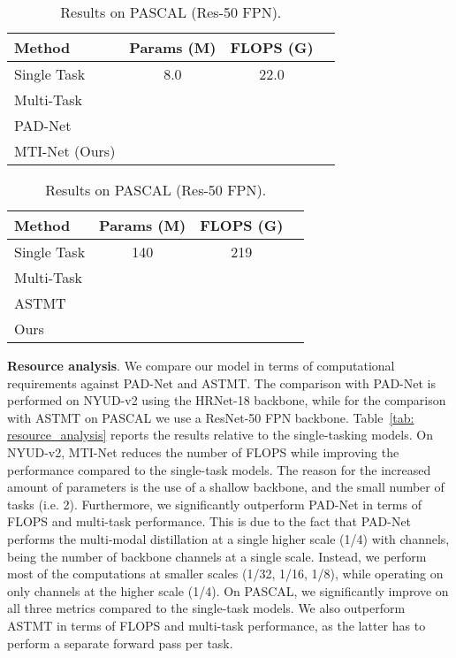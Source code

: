 \documentclass[runningheads]{llncs}
\begin{document}
\begin{table}[t]
    \caption{Computational resource analysis (number of parameters and FLOPS).}
    \label{tab: resource_analysis}
    \begin{subtable}[t]{0.47\linewidth}
    \caption{Results on NYUD-v2 (HRNet-18).}
    \label{tab: nyu_resources}
    \centering
    \tiny{
    \begin{tabular}{|l|c|c|c|}
    \hline
    Method & Params (M) & FLOPS (G) &  \\
    \hline
    Single Task & 8.0 & 22.0 &  \\
    Multi-Task &  &  &  \\
    PAD-Net &  &  &  \\
    MTI-Net (Ours) &  &  &  \\
    \hline
    \end{tabular}}
    \end{subtable}
    \hspace*{0.01\linewidth}
    \begin{subtable}[t]{0.47\linewidth}
    \centering
    \caption{Results on PASCAL (Res-50 FPN).}
    \label{tab: pascal_resources}
    \tiny{\begin{tabular}{|l|c|c|c|}
    \hline
    Method & Params (M) & FLOPS (G) &  \\
    \hline
    Single Task	& 140 & 219	& 	\\
    Multi-Task &  &  &  \\
    ASTMT &	 &  &  \\
    Ours &  &  &  \\
    \hline
    \end{tabular}}
    \end{subtable}\end{table}

\noindent\textbf{Resource analysis}.
We compare our model in terms of computational requirements against PAD-Net and ASTMT. The comparison with PAD-Net is performed on NYUD-v2 using the HRNet-18 backbone, while for the comparison with ASTMT on PASCAL we use a ResNet-50 FPN backbone. Table~\ref{tab: resource_analysis} reports the results relative to the single-tasking models. On NYUD-v2, MTI-Net reduces the number of FLOPS while improving the performance compared to the single-task models. The reason for the increased amount of parameters is the use of a shallow backbone, and the small number of tasks (i.e. 2). Furthermore, we significantly outperform PAD-Net in terms of FLOPS and multi-task performance. This is due to the fact that PAD-Net performs the multi-modal distillation at a single higher scale (1/4) with  channels,  being the number of backbone channels at a single scale. Instead, we perform most of the computations at smaller scales (1/32, 1/16, 1/8), while operating on only  channels at the higher scale (1/4). On PASCAL, we significantly improve on all three metrics compared to the single-task models. We also outperform ASTMT in terms of FLOPS and multi-task performance, as the latter has to perform a separate forward pass per task. 
\end{document}
